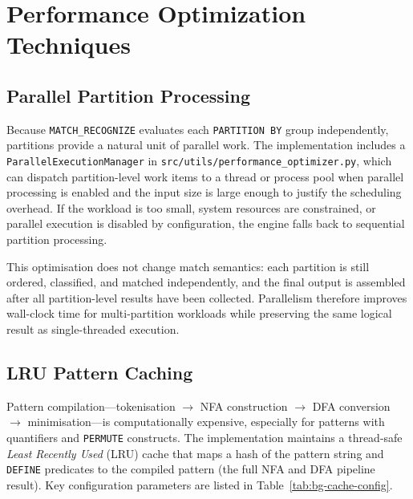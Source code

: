\section{Performance Optimization Techniques}
\label{sec:bg-performance}

\subsection{Parallel Partition Processing}
\label{subsec:bg-parallel}

Because \texttt{MATCH\_RECOGNIZE} evaluates each
\texttt{PARTITION BY} group independently, partitions provide a
natural unit of parallel work.  The implementation includes a
\texttt{ParallelExecutionManager} in
\texttt{src/utils/performance\_optimizer.py}, which can dispatch
partition-level work items to a thread or process pool when
parallel processing is enabled and the input size is large enough
to justify the scheduling overhead.  If the workload is too small,
system resources are constrained, or parallel execution is disabled
by configuration, the engine falls back to sequential partition
processing.

This optimisation does not change match semantics: each partition
is still ordered, classified, and matched independently, and the
final output is assembled after all partition-level results have
been collected.  Parallelism therefore improves wall-clock time for
multi-partition workloads while preserving the same logical result
as single-threaded execution.

\subsection{LRU Pattern Caching}
\label{subsec:bg-caching}

Pattern compilation---tokenisation $\to$ NFA construction $\to$ DFA
conversion $\to$ minimisation---is computationally expensive,
especially for patterns with quantifiers and \texttt{PERMUTE}
constructs.  The implementation maintains a thread-safe
\emph{Least Recently Used} (LRU) cache that maps a hash of the
pattern string and \texttt{DEFINE} predicates to the compiled
pattern (the full NFA and DFA pipeline result).
Key configuration parameters are listed in
Table~\ref{tab:bg-cache-config}.

